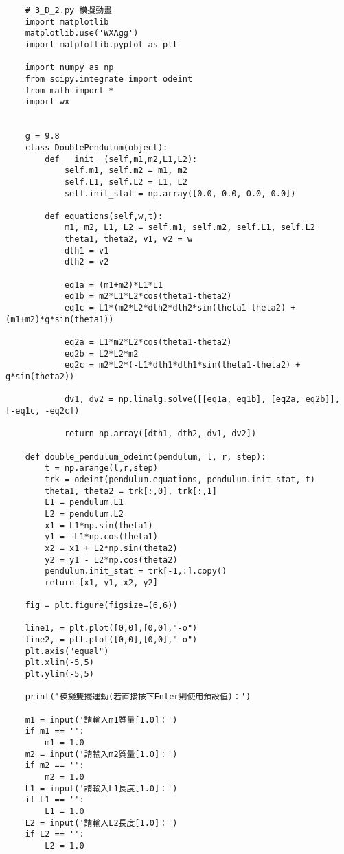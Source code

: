 \documentclass[UTF8,a4paper,12pt]{article}
\begin{document}
\begin{lstlisting}
    # 3_D_2.py 模擬動畫
    import matplotlib
    matplotlib.use('WXAgg')
    import matplotlib.pyplot as plt
    
    import numpy as np
    from scipy.integrate import odeint
    from math import *
    import wx
    
    
    g = 9.8
    class DoublePendulum(object):
        def __init__(self,m1,m2,L1,L2):
            self.m1, self.m2 = m1, m2
            self.L1, self.L2 = L1, L2
            self.init_stat = np.array([0.0, 0.0, 0.0, 0.0])
    
        def equations(self,w,t):
            m1, m2, L1, L2 = self.m1, self.m2, self.L1, self.L2
            theta1, theta2, v1, v2 = w
            dth1 = v1
            dth2 = v2
    
            eq1a = (m1+m2)*L1*L1
            eq1b = m2*L1*L2*cos(theta1-theta2)
            eq1c = L1*(m2*L2*dth2*dth2*sin(theta1-theta2) + (m1+m2)*g*sin(theta1))
    
            eq2a = L1*m2*L2*cos(theta1-theta2)
            eq2b = L2*L2*m2
            eq2c = m2*L2*(-L1*dth1*dth1*sin(theta1-theta2) + g*sin(theta2))
    
            dv1, dv2 = np.linalg.solve([[eq1a, eq1b], [eq2a, eq2b]], [-eq1c, -eq2c])
    
            return np.array([dth1, dth2, dv1, dv2])
    
    def double_pendulum_odeint(pendulum, l, r, step):
        t = np.arange(l,r,step)
        trk = odeint(pendulum.equations, pendulum.init_stat, t)
        theta1, theta2 = trk[:,0], trk[:,1]
        L1 = pendulum.L1
        L2 = pendulum.L2
        x1 = L1*np.sin(theta1)
        y1 = -L1*np.cos(theta1)
        x2 = x1 + L2*np.sin(theta2)
        y2 = y1 - L2*np.cos(theta2)
        pendulum.init_stat = trk[-1,:].copy()
        return [x1, y1, x2, y2]
    
    fig = plt.figure(figsize=(6,6))
    
    line1, = plt.plot([0,0],[0,0],"-o")
    line2, = plt.plot([0,0],[0,0],"-o")
    plt.axis("equal")
    plt.xlim(-5,5)
    plt.ylim(-5,5)
    
    print('模擬雙擺運動(若直接按下Enter則使用預設值)：')
    
    m1 = input('請輸入m1質量[1.0]：')
    if m1 == '':
        m1 = 1.0
    m2 = input('請輸入m2質量[1.0]：')
    if m2 == '':
        m2 = 1.0
    L1 = input('請輸入L1長度[1.0]：')
    if L1 == '':
        L1 = 1.0
    L2 = input('請輸入L2長度[1.0]：')
    if L2 == '':
        L2 = 1.0
    

\end{lstlisting}
\end{document}
